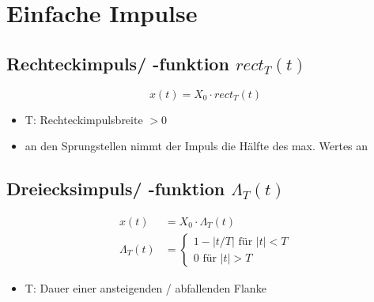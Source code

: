 \section{Einfache Impulse}
\subsection{Rechteckimpuls/ -funktion \texorpdfstring{$rect_T\left(t\right)$}{}}
\begin{multicols}{2}
\begin{equation*}
x\left(t\right) = X_0 \cdot rect_T\left(t\right) 
\end{equation*}

\begin{itemize}
 \item T: Rechteckimpulsbreite \(> 0\)
 \item an den Sprungstellen nimmt der Impuls die Hälfte des max. Wertes an
\end{itemize}

\begin{center}
 
\end{center}

\end{multicols}

\subsection{Dreiecksimpuls/ -funktion \texorpdfstring{$\Lambda_T\left(t\right)$}{}}
\begin{multicols}{2}
 \begin{align*}
x\left(t\right) &= X_0 \cdot \Lambda_T\left(t\right) \\
\Lambda_T\left(t\right) &=\begin{cases}
1-\left|t/T\right| \text{ für } \left|t\right| < T\\
0 \text{ für } \left|t\right| > T
\end{cases}
\end{align*}

\begin{itemize}
 \item T: Dauer einer ansteigenden / abfallenden Flanke
\end{itemize}

\begin{center}
 
\end{center}

\end{multicols}

